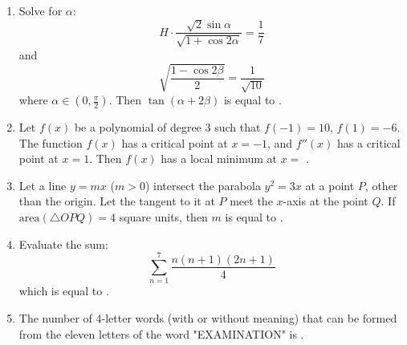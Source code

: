 \documentclass{article}
\begin{document}
\begin{enumerate}
\item Solve for $\alpha$:
\[
H \cdot \frac{\sqrt{2} \sin \alpha}{\sqrt{1 + \cos 2\alpha}} = \frac{1}{7}
\]
and 
\[
\sqrt{\frac{1 - \cos 2\beta}{2}} = \frac{1}{\sqrt{10}}
\]
where $\alpha \in (0, \frac{\pi}{2})$. Then $\tan(\alpha + 2\beta)$ is equal to \underline{\hspace{2cm}}.

\item Let $f(x)$ be a polynomial of degree $3$ such that $f(-1) = 10$, $f(1) = -6$. The function $f(x)$ has a critical point at $x = -1$, and $f''(x)$ has a critical point at $x = 1$. Then $f(x)$ has a local minimum at $x = $ \underline{\hspace{2cm}}.

\item Let a line $y = mx$ ($m > 0$) intersect the parabola $y^2 = 3x$ at a point $P$, other than the origin. Let the tangent to it at $P$ meet the $x$-axis at the point $Q$. If $\text{area}(\triangle OPQ) = 4$ square units, then $m$ is equal to \underline{\hspace{2cm}}.

\item Evaluate the sum:
\[
\sum_{n=1}^{7} \frac{n(n + 1)(2n + 1)}{4}
\]
which is equal to \underline{\hspace{2cm}}.

\item The number of 4-letter words (with or without meaning) that can be formed from the eleven letters of the word "EXAMINATION" is \underline{\hspace{2cm}}.

\end{enumerate}
\end{document}

